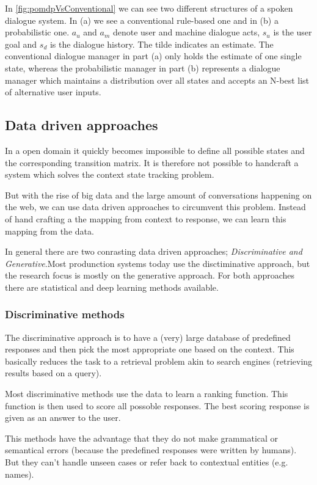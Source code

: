 \documentclass[conference]{IEEEtran}
\begin{document}
In \autoref{fig:pomdpVsConventional} we can see two different structures of a spoken dialogue system. In (a) we see a conventional rule-based one and in (b) a probabilistic one. $a_{u}$ and $a_{m}$ denote user and machine dialogue acts, $s_{u}$ is the user goal and $s_{d}$ is the dialogue history. The tilde indicates an estimate.
The conventional dialogue manager in part (a) only holds the estimate of one single state, whereas the probabilistic manager in part (b) represents a dialogue manager which maintains a distribution over all states and accepts an N-best list of alternative user inputs\cite{young2010hidden}.  

\subsection{Data driven approaches}
In a open domain it quickly becomes impossible to define all possible states and the corresponding transition matrix. It is therefore not possible to handcraft a system which solves the context state tracking problem\cite{radlinski2017theoretical}.

But with the rise of big data and the large amount of conversations happening on the web, we can use data driven approaches to circumvent this problem. Instead of hand crafting a the mapping from context to response, we can learn this mapping from the data.

In general there are two conrasting data driven approaches; \emph{Discriminative and Generative}.Most produnction systems today use the disctiminative approach, but the research focus is mostly on the generative approach. For both approaches there are statistical and deep learning methods available\cite{yan2016shall}.

\subsubsection{Discriminative methods}
The discriminative approach is to have a (very) large database of predefined responses and then pick the most appropriate one based on the context. This basically reduces the task to a retrieval problem akin to search engines (retrieving results based on a query).

Most discriminative methods use the data to learn a ranking function. This function is then used to score all possoble responses. The best scoring response is given as an answer to the user.\cite{yan2016shall}

This methods have the advantage that they do not make grammatical or semantical errors (because the predefined responses were written by humans). But they can't handle unseen cases or refer back to contextual entities (e.g. names).
\end{document}
